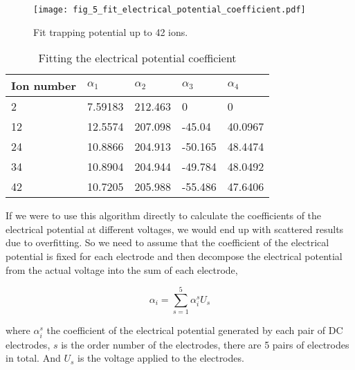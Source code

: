 \begin{figure}
    \centering
    \texttt{[image: fig\_5\_fit\_electrical\_potential\_coefficient.pdf]}
    \caption{Fit trapping potential up to 42 ions.}
    \label{fig:fit_electrical_potential_coefficient}
\end{figure}

\begin{table}
    \centering
    \caption{Fitting the electrical potential coefficient}
    \begin{tabular}{lllll}
        \toprule
        Ion number & $\alpha_1$ & $\alpha_2$ & $\alpha_3$ & $\alpha_4$ \\
        \midrule
        2          & 7.59183    & 212.463    & 0          & 0          \\
        12         & 12.5574    & 207.098    & -45.04     & 40.0967    \\
        24         & 10.8866    & 204.913    & -50.165    & 48.4474    \\
        34         & 10.8904    & 204.944    & -49.784    & 48.0492    \\
        42         & 10.7205    & 205.988    & -55.486    & 47.6406    \\
        \bottomrule
    \end{tabular}
    \label{tab:fitting_the_electrical_potential_coefficient}
\end{table}

If we were to use this algorithm directly to calculate the coefficients of the electrical potential at different voltages, we would end up with scattered results due to overfitting. So we need to assume that the coefficient of the electrical potential is fixed for each electrode and then decompose the electrical potential from the actual voltage into the sum of each electrode,

\begin{equation}
    \alpha_i=\sum_{s=1}^5 \alpha_i^s U_s
\end{equation}

where $\alpha_i^s$ the coefficient of the electrical potential generated by each pair of DC electrodes, $s$ is the order number of the electrodes, there are 5 pairs of electrodes in total. And $U_s$ is the voltage applied to the electrodes.

